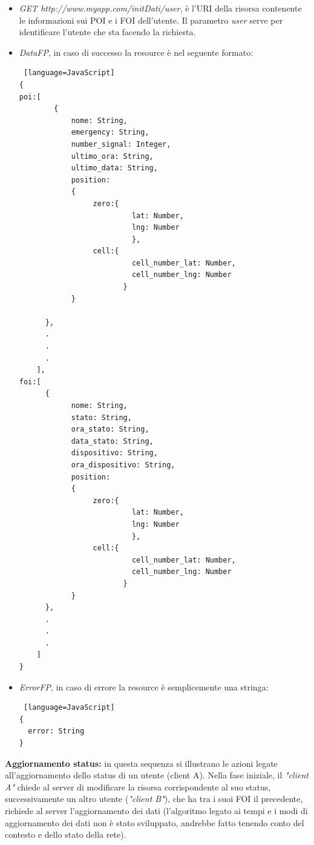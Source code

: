 \begin{itemize}
\item \textit{GET http://www.myapp.com/initDati/user}, è l'URI della risorsa contenente le informazioni sui POI e i FOI dell'utente. Il parametro \textit{user} serve per identificare l'utente che sta facendo la richiesta.
\item \textit{DataFP}, in caso di successo la resource è nel seguente formato:\\
\begin{lstlisting} [language=JavaScript]
{
poi:[
		{
			nome: String,
			emergency: String,
			number_signal: Integer,
			ultimo_ora: String,
			ultimo_data: String,
			position: 
			{
			     zero:{
			              lat: Number,
			              lng: Number
			              },
			     cell:{
			              cell_number_lat: Number,
			              cell_number_lng: Number
			            }
			}
			
	  },
	  .
	  .
	  .
	],
foi:[
	  {
			nome: String,
			stato: String,
			ora_stato: String,
			data_stato: String,
			dispositivo: String,
			ora_dispositivo: String,
			position: 
			{
			     zero:{
			              lat: Number,
			              lng: Number
			              },
			     cell:{
			              cell_number_lat: Number,
			              cell_number_lng: Number
			            }
			}
	  },
	  .
	  .
	  .
	]
}
\end{lstlisting}
\item \textit{ErrorFP}, in caso di errore la resource è semplicemente una stringa:\\
\begin{lstlisting} [language=JavaScript]
{
  error: String
}
\end{lstlisting}
\end{itemize}
\newpage
 \textbf{Aggiornamento status:} in questa sequenza si illustrano le azioni legate all'aggiornamento dello status di un utente (client A).  Nella fase iniziale, il \textit{"client A"} chiede al server di modificare la risorsa corrispondente al suo status, successivamente un altro utente (\textit{"client B"}), che ha tra i suoi FOI il precedente, richiede al server l'aggiornamento dei dati (l'algoritmo legato ai tempi e i modi di aggiornamento dei dati non è stato sviluppato, andrebbe fatto tenendo conto del contesto e dello stato della rete).\\

